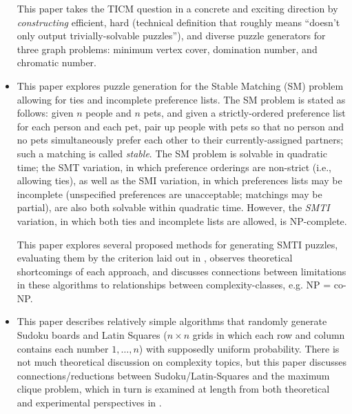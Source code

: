 \documentclass{extarticle}
\begin{document}
\begin{itemize}
\begin{annotation}
      This paper takes the TICM question in a concrete and exciting direction
      by \emph{constructing} efficient, hard (technical definition that roughly
      means ``doesn't only output trivially-solvable puzzles''), and diverse
      puzzle generators for three graph problems: minimum vertex cover,
      domination number, and chromatic number.
    \end{annotation}

  \item {}

    \begin{annotation}
      This paper explores puzzle generation for the Stable Matching (SM)
      problem allowing for ties and incomplete preference lists.  The SM
      problem is stated as follows: given \(n\) people and \(n\) pets, and
      given a strictly-ordered preference list for each person and each pet,
      pair up people with pets so that no person and no pets simultaneously
      prefer each other to their currently-assigned partners; such a matching
      is called \emph{stable}.  The SM problem is solvable in quadratic time;
      the SMT variation, in which preference orderings are non-strict (i.e.,
      allowing ties), as well as the SMI variation, in which preferences lists
      may be incomplete (unspecified preferences are unacceptable; matchings
      may be partial), are also both solvable within quadratic time.  However,
      the \emph{SMTI} variation, in which both ties and incomplete lists are
      allowed, is NP-complete.

      This paper explores several proposed methods for generating SMTI puzzles,
      evaluating them by the criterion laid out in
      \textcite{test-gen-complexity}, observes theoretical shortcomings of each
      approach, and discusses connections between limitations in these
      algorithms to relationships between complexity-classes, e.g. NP = co-NP.
    \end{annotation}

  \item {}

    \begin{annotation}
      This paper describes relatively simple algorithms that randomly generate
      Sudoku boards and Latin Squares (\(n \times n\) grids in which each row
      and column contains each number \(1, \dotsc, n\)) with supposedly uniform
      probability.  There is not much theoretical discussion on complexity
      topics, but this paper discusses connections/reductions between
      Sudoku/Latin-Squares and the maximum clique problem, which in turn is
      examined at length from both theoretical and experimental perspectives in
      \textcite{maximum-clique-generators}.
    \end{annotation}


\end{itemize}
\end{document}
